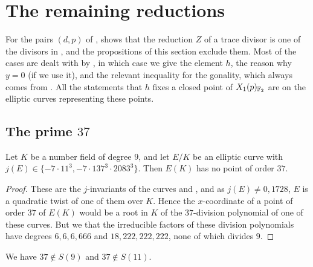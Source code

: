\section{The remaining reductions}\label{sec:exceptions}

For the pairs $(d,p)$ of ,  shows that the reduction $Z$ of a trace divisor is one of the divisors in , and the propositions of this section exclude them. Most of the cases are dealt with by , in which case we give the element $h$, the reason why $y=0$ (if we use it), and the relevant inequality for the gonality, which always comes from . All the statements that $h$ fixes a closed point of $X_1(p)_{\mathbb{F}_2}$ are  on the elliptic curves representing these points.

\subsection{The prime \texorpdfstring{$37$}{37}}

\begin{lemma}\label{lem:37twist}
Let $K$ be a number field of degree $9$, and let $E/K$ be an elliptic curve with $j(E)\in\{-7\cdot11^3,-7\cdot137^3\cdot2083^3\}$. Then $E(K)$ has no point of order $37$.
\end{lemma}

\begin{proof}
These are the $j$-invariants of the curves  and , and as $j(E)\neq0,1728$, $E$ is a quadratic twist of one of them over $K$. Hence the $x$-coordinate of a point of order $37$ of $E(K)$ would be a root in $K$ of the $37$-division polynomial of one of these curves. But we  that the irreducible factors of these division polynomials have degrees $6,6,6,666$ and $18,222,222,222$, none of which divides $9$.
\end{proof}

\begin{proposition}\label{prop:37}
We have $37\notin S(9)$ and $37\notin S(11)$.
\end{proposition}

